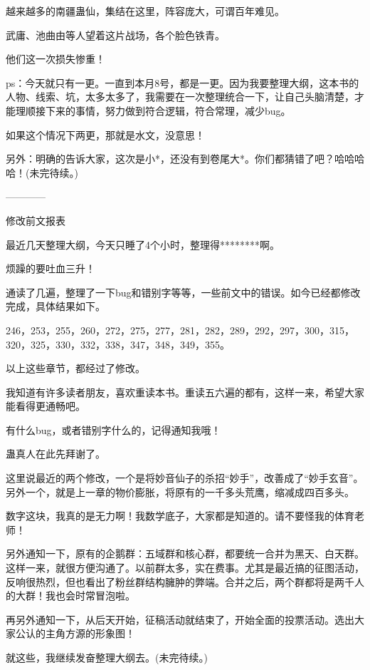 \begin{this_body}
越来越多的南疆蛊仙，集结在这里，阵容庞大，可谓百年难见。

武庸、池曲由等人望着这片战场，各个脸色铁青。

他们这一次损失惨重！

ps：今天就只有一更。一直到本月8号，都是一更。因为我要整理大纲，这本书的人物、线索、坑，太多太多了，我需要在一次整理统合一下，让自己头脑清楚，才能理顺接下来的事情，努力做到符合逻辑，符合常理，减少bug。

如果这个情况下两更，那就是水文，没意思！

另外：明确的告诉大家，这次是小*，还没有到卷尾大*。你们都猜错了吧？哈哈哈哈！(未完待续。)

------------

修改前文报表

最近几天整理大纲，今天只睡了4个小时，整理得********啊。

烦躁的要吐血三升！

通读了几遍，整理了一下bug和错别字等等，一些前文中的错误。如今已经都修改完成，具体结果如下。

246，253，255，260，272，275，277，281，282，289，292，297，300，315，320，325，330，332，338，347，348，349，355。

以上这些章节，都经过了修改。

我知道有许多读者朋友，喜欢重读本书。重读五六遍的都有，这样一来，希望大家能看得更通畅吧。

有什么bug，或者错别字什么的，记得通知我哦！

蛊真人在此先拜谢了。

这里说最近的两个修改，一个是将妙音仙子的杀招“妙手”，改善成了“妙手玄音”。另外一个，就是上一章的物价膨胀，将原有的一千多头荒鹰，缩减成四百多头。

数字这块，我真的是无力啊！我数学底子，大家都是知道的。请不要怪我的体育老师！

另外通知一下，原有的企鹅群：五域群和核心群，都要统一合并为黑天、白天群。这样一来，就很方便沟通了。以前群太多，实在费事。尤其是最近搞的征图活动，反响很热烈，但也看出了粉丝群结构臃肿的弊端。合并之后，两个群都将是两千人的大群！我也会时常冒泡啦。

再另外通知一下，从后天开始，征稿活动就结束了，开始全面的投票活动。选出大家公认的主角方源的形象图！

就这些，我继续发奋整理大纲去。(未完待续。)

\end{this_body}

